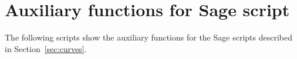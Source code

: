 \section{Auxiliary functions for Sage script}
\label{app:sage}

The following scripts show the auxiliary functions for the Sage scripts described in Section~\ref{sec:curves}.

